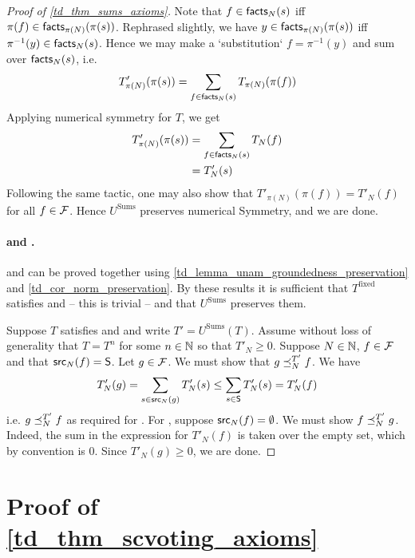 \begin{proof}[Proof of \cref{td_thm_sums_axioms}]
Note that $f \in \mathsf{facts}_N(s)$ iff $\pi(f) \in \mathsf{facts}_{\pi(N)}(\pi(s))$.
Rephrased slightly, we have $y \in \mathsf{facts}_{\pi(N)}(\pi(s))$ iff $\pi^{-1}(y)
\in \mathsf{facts}_N(s)$. Hence we may make a `substitution` $f = \pi^{-1}(y)$ and sum
over $\mathsf{facts}_N(s)$, i.e.
\[
    T'_{\pi(N)}(\pi(s))
    = \sum_{f \in \mathsf{facts}_N(s)}{T_{\pi(N)}(\pi(f))}
\]
Applying numerical symmetry for $T$, we get
\begin{align*}
    T'_{\pi(N)}(\pi(s))
    &= \sum_{f \in \mathsf{facts}_N(s)}{T_N(f)} \\
    &= T'_N(s)
\end{align*}
Following the same tactic, one may also show that $T'_{\pi(N)}(\pi(f)) =
T'_N(f)$ for all $f \in \mathcal{F}$. Hence $U^{\text{Sums}}$ preserves numerical
Symmetry, and we are done.

\paragraph{\unanimity{} and \groundedness{}.}

\unanimity{} and \groundedness{} can be proved together using
\cref{td_lemma_unam_groundedness_preservation} and \cref{td_cor_norm_preservation}.
By these results it is sufficient that $T^{\text{fixed}}$ satisfies
\unanimity{}
and \groundedness{} -- this is trivial -- and that $U^{\text{Sums}}$ preserves
them.

Suppose $T$ satisfies \unanimity{} and \groundedness{} and write $T' =
U^{\text{Sums}}(T)$. Assume without loss of generality that $T = T^n$ for some
$n \in \mathbb{N}$ so that $T'_N \ge 0$. Suppose $N \in \mathbb{N}$, $f \in \mathcal{F}$ and that
$\mathsf{src}_N(f) = \mathsf{S}$. Let $g \in \mathcal{F}$. We must show that $g \preceq_N^{T'} f$. We have
\[ T'_N(g) = \sum_{s \in \mathsf{src}_N(g)}{T'_N(s)} \le \sum_{s \in \mathsf{S}}{T'_N(s)} =
T'_N(f) \] i.e. $g \preceq_N^{T'} f$ as required for \unanimity{}. For
\groundedness{},
suppose $\mathsf{src}_N(f) = \emptyset$. We must show $f \preceq_N^{T'} g$. Indeed, the
sum in the expression for $T'_N(f)$ is taken over the empty set, which by
convention is 0.  Since $T'_N(g) \ge 0$, we are done.
\end{proof}

\section{Proof of \cref{td_thm_scvoting_axioms}}

